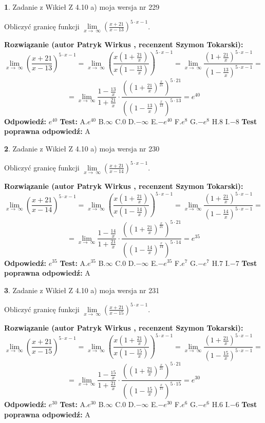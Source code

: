 \documentclass[12pt, a4paper]{article}
\theoremstyle{definition} %
\newtheorem{zad}{}
\newcommand{\zadStart}[1]{\begin{zad}#1\newline}
\newcommand{\zadStop}{\end{zad}}
\newcommand{\rozwStart}[2]{\noindent \textbf{Rozwiązanie (autor #1 , recenzent #2): }\newline}
\newcommand{\rozwStop}{\newline}
\newcommand{\odpStart}{\noindent \textbf{Odpowiedź:}\newline}
\newcommand{\odpStop}{\newline}
\newcommand{\testStart}{\noindent \textbf{Test:}\newline}
\newcommand{\testStop}{\newline}
\newcommand{\kluczStart}{\noindent \textbf{Test poprawna odpowiedź:}\newline}
\newcommand{\kluczStop}{\newline}
\begin{document}
\zadStart{Zadanie z Wikieł Z 4.10 a) moja wersja nr 229}

Obliczyć granicę funkcji  $\lim\limits_{x\to\ \infty}(\frac{x+21}{x-13})^{5\cdot x-1}$.
\zadStop
\rozwStart{Patryk Wirkus}{Szymon Tokarski}
$$\lim\limits_{x\to\ \infty}(\frac{x+21}{x-13})^{5\cdot x-1} = \lim\limits_{x\to\ \infty}(\frac{x(1+\frac{21}{x})}{x(1-\frac{13}{x})})^{5\cdot x-1}=\lim\limits_{x\to\ \infty}\frac{(1+\frac{21}{x})^{5\cdot x-1}}{(1-\frac{13}{x})^{5\cdot x-1}}=$$
$$=\lim\limits_{x\to\ \infty}\frac{1-\frac{13}{x}}{1+\frac{21}{x}}\cdot\frac{((1+\frac{21}{x})^{\frac{x}{21}})^{5\cdot21}}{((1-\frac{13}{x})^{\frac{x}{13}})^{5\cdot13}}=e^{40}$$
\rozwStop
\odpStart
$e^{40}$
\odpStop
\testStart
A.$e^{40}$ B.$\infty$ C.$0$ D.$-\infty$ E.$-e^{40}$
F.$e^{8}$ G.$-e^{8}$
H.$8$
I.$-8$
\testStop
\kluczStart
A
\kluczStop



\zadStart{Zadanie z Wikieł Z 4.10 a) moja wersja nr 230}

Obliczyć granicę funkcji  $\lim\limits_{x\to\ \infty}(\frac{x+21}{x-14})^{5\cdot x-1}$.
\zadStop
\rozwStart{Patryk Wirkus}{Szymon Tokarski}
$$\lim\limits_{x\to\ \infty}(\frac{x+21}{x-14})^{5\cdot x-1} = \lim\limits_{x\to\ \infty}(\frac{x(1+\frac{21}{x})}{x(1-\frac{14}{x})})^{5\cdot x-1}=\lim\limits_{x\to\ \infty}\frac{(1+\frac{21}{x})^{5\cdot x-1}}{(1-\frac{14}{x})^{5\cdot x-1}}=$$
$$=\lim\limits_{x\to\ \infty}\frac{1-\frac{14}{x}}{1+\frac{21}{x}}\cdot\frac{((1+\frac{21}{x})^{\frac{x}{21}})^{5\cdot21}}{((1-\frac{14}{x})^{\frac{x}{14}})^{5\cdot14}}=e^{35}$$
\rozwStop
\odpStart
$e^{35}$
\odpStop
\testStart
A.$e^{35}$ B.$\infty$ C.$0$ D.$-\infty$ E.$-e^{35}$
F.$e^{7}$ G.$-e^{7}$
H.$7$
I.$-7$
\testStop
\kluczStart
A
\kluczStop



\zadStart{Zadanie z Wikieł Z 4.10 a) moja wersja nr 231}

Obliczyć granicę funkcji  $\lim\limits_{x\to\ \infty}(\frac{x+21}{x-15})^{5\cdot x-1}$.
\zadStop
\rozwStart{Patryk Wirkus}{Szymon Tokarski}
$$\lim\limits_{x\to\ \infty}(\frac{x+21}{x-15})^{5\cdot x-1} = \lim\limits_{x\to\ \infty}(\frac{x(1+\frac{21}{x})}{x(1-\frac{15}{x})})^{5\cdot x-1}=\lim\limits_{x\to\ \infty}\frac{(1+\frac{21}{x})^{5\cdot x-1}}{(1-\frac{15}{x})^{5\cdot x-1}}=$$
$$=\lim\limits_{x\to\ \infty}\frac{1-\frac{15}{x}}{1+\frac{21}{x}}\cdot\frac{((1+\frac{21}{x})^{\frac{x}{21}})^{5\cdot21}}{((1-\frac{15}{x})^{\frac{x}{15}})^{5\cdot15}}=e^{30}$$
\rozwStop
\odpStart
$e^{30}$
\odpStop
\testStart
A.$e^{30}$ B.$\infty$ C.$0$ D.$-\infty$ E.$-e^{30}$
F.$e^{6}$ G.$-e^{6}$
H.$6$
I.$-6$
\testStop
\kluczStart
A
\kluczStop
\end{document}
